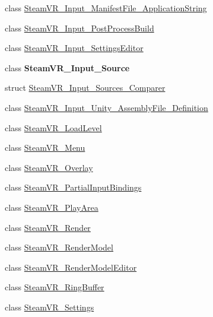 \begin{DoxyCompactItemize}
\item 
class \mbox{\hyperlink{class_valve_1_1_v_r_1_1_steam_v_r___input___manifest_file___application_string}{Steam\+V\+R\+\_\+\+Input\+\_\+\+Manifest\+File\+\_\+\+Application\+String}}
\item 
class \mbox{\hyperlink{class_valve_1_1_v_r_1_1_steam_v_r___input___post_process_build}{Steam\+V\+R\+\_\+\+Input\+\_\+\+Post\+Process\+Build}}
\item 
class \mbox{\hyperlink{class_valve_1_1_v_r_1_1_steam_v_r___input___settings_editor}{Steam\+V\+R\+\_\+\+Input\+\_\+\+Settings\+Editor}}
\item 
class {\bfseries Steam\+V\+R\+\_\+\+Input\+\_\+\+Source}
\item 
struct \mbox{\hyperlink{struct_valve_1_1_v_r_1_1_steam_v_r___input___sources___comparer}{Steam\+V\+R\+\_\+\+Input\+\_\+\+Sources\+\_\+\+Comparer}}
\item 
class \mbox{\hyperlink{class_valve_1_1_v_r_1_1_steam_v_r___input___unity___assembly_file___definition}{Steam\+V\+R\+\_\+\+Input\+\_\+\+Unity\+\_\+\+Assembly\+File\+\_\+\+Definition}}
\item 
class \mbox{\hyperlink{class_valve_1_1_v_r_1_1_steam_v_r___load_level}{Steam\+V\+R\+\_\+\+Load\+Level}}
\item 
class \mbox{\hyperlink{class_valve_1_1_v_r_1_1_steam_v_r___menu}{Steam\+V\+R\+\_\+\+Menu}}
\item 
class \mbox{\hyperlink{class_valve_1_1_v_r_1_1_steam_v_r___overlay}{Steam\+V\+R\+\_\+\+Overlay}}
\item 
class \mbox{\hyperlink{class_valve_1_1_v_r_1_1_steam_v_r___partial_input_bindings}{Steam\+V\+R\+\_\+\+Partial\+Input\+Bindings}}
\item 
class \mbox{\hyperlink{class_valve_1_1_v_r_1_1_steam_v_r___play_area}{Steam\+V\+R\+\_\+\+Play\+Area}}
\item 
class \mbox{\hyperlink{class_valve_1_1_v_r_1_1_steam_v_r___render}{Steam\+V\+R\+\_\+\+Render}}
\item 
class \mbox{\hyperlink{class_valve_1_1_v_r_1_1_steam_v_r___render_model}{Steam\+V\+R\+\_\+\+Render\+Model}}
\item 
class \mbox{\hyperlink{class_valve_1_1_v_r_1_1_steam_v_r___render_model_editor}{Steam\+V\+R\+\_\+\+Render\+Model\+Editor}}
\item 
class \mbox{\hyperlink{class_valve_1_1_v_r_1_1_steam_v_r___ring_buffer}{Steam\+V\+R\+\_\+\+Ring\+Buffer}}
\item 
class \mbox{\hyperlink{class_valve_1_1_v_r_1_1_steam_v_r___settings}{Steam\+V\+R\+\_\+\+Settings}}

\end{DoxyCompactItemize}
